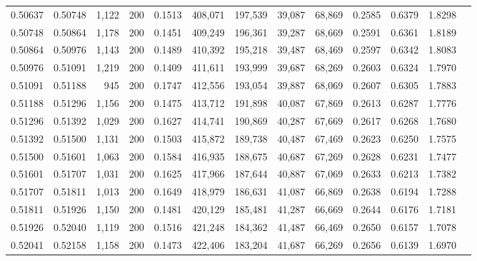 \begin{tabular}{rrrrrrrrrrrrr}
0.50637 & 0.50748 & 1,122 & 200 &                                     0.1513 & 408,071 & 197,539 &  39,087 &  68,869 & 0.2585 & 0.6379 & 1.8298 \\
0.50748 & 0.50864 & 1,178 & 200 &                                     0.1451 & 409,249 & 196,361 &  39,287 &  68,669 & 0.2591 & 0.6361 & 1.8189 \\
0.50864 & 0.50976 & 1,143 & 200 &                                     0.1489 & 410,392 & 195,218 &  39,487 &  68,469 & 0.2597 & 0.6342 & 1.8083 \\
0.50976 & 0.51091 & 1,219 & 200 &                                     0.1409 & 411,611 & 193,999 &  39,687 &  68,269 & 0.2603 & 0.6324 & 1.7970 \\
0.51091 & 0.51188 &   945 & 200 &                                     0.1747 & 412,556 & 193,054 &  39,887 &  68,069 & 0.2607 & 0.6305 & 1.7883 \\
0.51188 & 0.51296 & 1,156 & 200 &                                     0.1475 & 413,712 & 191,898 &  40,087 &  67,869 & 0.2613 & 0.6287 & 1.7776 \\
0.51296 & 0.51392 & 1,029 & 200 &                                     0.1627 & 414,741 & 190,869 &  40,287 &  67,669 & 0.2617 & 0.6268 & 1.7680 \\
0.51392 & 0.51500 & 1,131 & 200 &                                     0.1503 & 415,872 & 189,738 &  40,487 &  67,469 & 0.2623 & 0.6250 & 1.7575 \\
0.51500 & 0.51601 & 1,063 & 200 &                                     0.1584 & 416,935 & 188,675 &  40,687 &  67,269 & 0.2628 & 0.6231 & 1.7477 \\
0.51601 & 0.51707 & 1,031 & 200 &                                     0.1625 & 417,966 & 187,644 &  40,887 &  67,069 & 0.2633 & 0.6213 & 1.7382 \\
0.51707 & 0.51811 & 1,013 & 200 &                                     0.1649 & 418,979 & 186,631 &  41,087 &  66,869 & 0.2638 & 0.6194 & 1.7288 \\
0.51811 & 0.51926 & 1,150 & 200 &                                     0.1481 & 420,129 & 185,481 &  41,287 &  66,669 & 0.2644 & 0.6176 & 1.7181 \\
0.51926 & 0.52040 & 1,119 & 200 &                                     0.1516 & 421,248 & 184,362 &  41,487 &  66,469 & 0.2650 & 0.6157 & 1.7078 \\
0.52041 & 0.52158 & 1,158 & 200 &                                     0.1473 & 422,406 & 183,204 &  41,687 &  66,269 & 0.2656 & 0.6139 & 1.6970 \\

\end{tabular}
